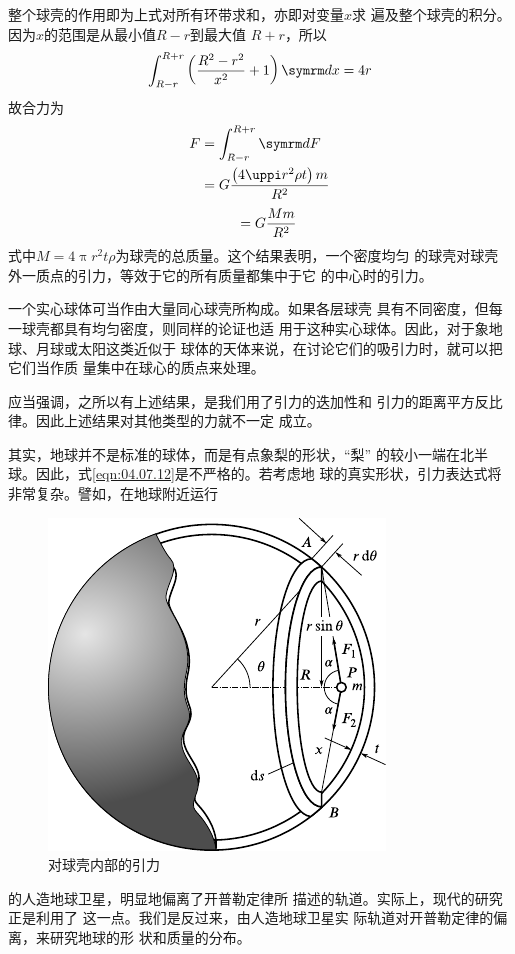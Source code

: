 整个球壳的作用即为上式对所有环带求和，亦即对变量$ x $求
遍及整个球壳的积分。因为$ x $的范围是从最小值$ R - r $到最大值
$ R + r $，所以
\begin{equation}\label{eqn:04.07.11}
  \int _ { R - r } ^ { R + r } \left( \frac { R ^ { 2 } - r ^ { 2 } } { x ^ { 2 } } + 1 \right) \dif x = 4 r
\end{equation}
故合力为
\begin{equation*}
  \begin{aligned}
    F & = \int _ { R - r } ^ { R + r } \dif F                                 \\
      & = G \frac { \left( 4 \uppi r ^ { 2 } \rho t \right) m } { R ^ { 2 } } \\
  \end{aligned}
\end{equation*}
\begin{equation}\label{eqn:04.07.12}
  \mbox \quad = G \frac { M m } { R ^ { 2 } }
\end{equation}
式中$ M = 4 \uppi r ^ { 2 } t \rho $为球壳的总质量。这个结果表明，一个密度均匀
的球壳对球壳外一质点的引力，等效于它的所有质量都集中于它
的中心时的引力。

一个实心球体可当作由大量同心球壳所构成。如果各层球壳
具有不同密度，但每一球壳都具有均匀密度，则同样的论证也适
用于这种实心球体。因此，对于象地球、月球或太阳这类近似于
球体的天体来说，在讨论它们的吸引力时，就可以把它们当作质
量集中在球心的质点来处理。

应当强调，之所以有上述结果，是我们用了引力的迭加性和
引力的距离平方反比律。因此上述结果对其他类型的力就不一定
成立。

其实，地球并不是标准的球体，而是有点象梨的形状，“梨”
的较小一端在北半球。因此，式\eqref{eqn:04.07.12}是不严格的。若考虑地
球的真实形状，引力表达式将非常复杂。譬如，在地球附近运行
\begin{figure}
  \vspace{-0.5em}
  \centering
  \includegraphics{figure/fig04.11}
  \caption{对球壳内部的引力}
  \label{fig:04.11}
\end{figure}
的人造地球卫星，明显地偏离了开普勒定律所
描述的轨道。实际上，现代的研究正是利用了
这一点。我们是反过来，由人造地球卫星实
际轨道对开普勒定律的偏离，来研究地球的形
状和质量的分布。

